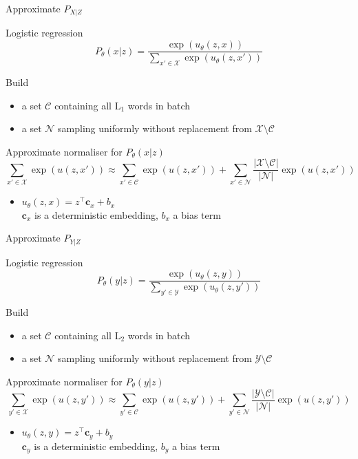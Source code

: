 \begin{frame}{Approximate $P_{X|Z}$}

Logistic regression
\begin{equation*}
P_\theta(x|z) = \frac{\exp(u_\theta(z, x))}{\sum_{x'\in \mathcal X} \exp(u_\theta(z, x'))}
\end{equation*}

\pause

Build
\begin{itemize}
	\item a set $\mathcal C$ containing all L$_1$ words in batch
	\item a set $\mathcal N$ sampling uniformly without replacement from $\mathcal X \setminus \mathcal C$
\end{itemize}

\pause 
Approximate normaliser for $P_\theta(x|z)$
\begin{equation*}
\sum_{x'\in \mathcal X} \exp(u(z, x')) \approx \sum_{x'\in \mathcal C} \exp(u(z, x')) + \sum_{x'\in \mathcal N} \frac{|\mathcal X \setminus \mathcal C|}{|\mathcal N|}\exp(u(z, x'))
\end{equation*}
\begin{itemize}
	\item $u_\theta(z, x) = z^\top \mathbf c_x + b_x$ \\
	$\mathbf c_x$ is a deterministic embedding, $b_x$ a bias term
\end{itemize}

\end{frame}

\begin{frame}{Approximate $P_{Y|Z}$}

Logistic regression
\begin{equation*}
P_\theta(y|z) = \frac{\exp(u_\theta(z, y))}{\sum_{y'\in \mathcal Y} \exp(u_\theta(z, y'))}
\end{equation*}

\pause

Build
\begin{itemize}
	\item a set $\mathcal C$ containing all L$_2$ words in batch
	\item a set $\mathcal N$ sampling uniformly without replacement from $\mathcal Y \setminus \mathcal C$
\end{itemize}

\pause 
Approximate normaliser for $P_\theta(y|z)$
\begin{equation*}
\sum_{y'\in \mathcal X} \exp(u(z, y')) \approx \sum_{y'\in \mathcal C} \exp(u(z, y')) + \sum_{y'\in \mathcal N} \frac{|\mathcal Y \setminus \mathcal C|}{|\mathcal N|}\exp(u(z, y'))
\end{equation*}
\begin{itemize}
	\item $u_\theta(z, y) = z^\top \mathbf c_y + b_y$ \\
	$\mathbf c_y$ is a deterministic embedding, $b_y$ a bias term
\end{itemize}

\end{frame}

